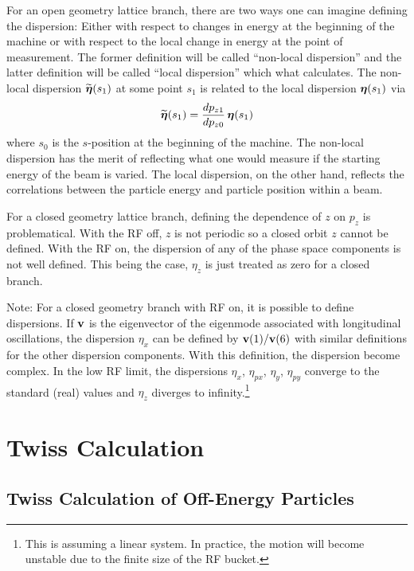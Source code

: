 For an open geometry lattice branch, there are two ways one can imagine
defining the dispersion: Either with respect to changes in energy at the beginning of the machine or
with respect to the local change in energy at the point of measurement. The former definition will
be called ``non-local dispersion'' and the latter definition will be called ``local dispersion''
which what \bmad calculates. The non-local dispersion $\widetilde{\boldsymbol{\eta}}(s_1)$ at some point $s_1$ is
related to the local dispersion $\boldsymbol{\eta}(s_1)$ via
\begin{equation}
  \widetilde{\boldsymbol{\eta}}(s_1) = \frac{dp_{z1}}{dp_{z0}} \, \boldsymbol{\eta}(s_1)
\end{equation}
where $s_0$ is the $s$-position at the beginning of the machine. The non-local dispersion has the
merit of reflecting what one would measure if the starting energy of the beam is varied. The local
dispersion, on the other hand, reflects the correlations between the particle energy and particle
position within a beam.

For a closed geometry lattice branch, defining the dependence of $z$ on $p_z$ is problematical.
With the RF off, $z$ is not periodic so a closed orbit $z$ cannot be defined.  With the RF on, the
dispersion of any of the phase space components is not well defined.  This being the case, $\eta_z$
is just treated as zero for a closed branch.  

Note: For a closed geometry branch with RF on, it is possible to define dispersions. If ${\bf v}$ is
the eigenvector of the eigenmode associated with longitudinal oscillations, the dispersion $\eta_x$
can be defined by ${\bf v}(1) / {\bf v}(6)$ with similar definitions for the other dispersion components.
With this definition, the dispersion become complex. In the low RF limit, the dispersions $\eta_x$,
$\eta_{px}$, $\eta_y$, $\eta_{py}$ converge to the standard (real) values and $\eta_z$ diverges
to infinity.\footnote
  {
This is assuming a linear system. In practice, the motion will become unstable due to
the finite size of the RF bucket.
  }

\section{Twiss Calculation}
\label{s:twiss.calc}

\subsection{Twiss Calculation of Off-Energy Particles}
\label{s:twiss.off}


